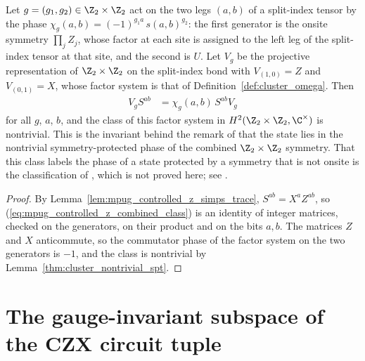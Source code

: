 \begin{lemma}
    \label{lem:mpug_controlled_z_combined_class}
    \leanok
    Let $g=(g_1,g_2)\in\Z_2\times\Z_2$ act on the two legs $(a,b)$ of a
    split-index tensor by the phase
    $\chi_g(a,b)=(-1)^{g_1a}\,s(a,b)^{g_2}$: the first generator is the onsite
    symmetry $\prod_jZ_j$, whose factor at each site is assigned to the left
    leg of the split-index tensor at that site, and the second is $U$. Let
    $V_g$ be the projective representation of $\Z_2\times\Z_2$ on the
    split-index bond with $V_{(1,0)}=Z$ and $V_{(0,1)}=X$, whose factor
    system is that of Definition~\ref{def:cluster_omega}. Then
    \begin{align}
        V_gS^{ab} & =\chi_g(a,b)\,S^{ab}V_g
        \label{eq:mpug_controlled_z_combined_class}
    \end{align}
    for all $g$, $a$, $b$, and the class of this factor system in
    $H^2(\Z_2\times\Z_2,\C^\times)$ is nontrivial. This is the invariant
    behind the remark of \cite[line~3970]{FrancoRubio2025MPUGauging} that the
    state lies in the nontrivial symmetry-protected phase of the combined
    $\Z_2\times\Z_2$ symmetry. That this class labels the phase of a state
    protected by a symmetry that is not onsite is the classification of
    \cite{Stephen2024SIMPS}, which is not proved here; see
    \cite{gap:fbc25_controlled_z_split_index_class_scope}.
\end{lemma}

\begin{proof}\leanok
    By Lemma~\ref{lem:mpug_controlled_z_simps_trace}, $S^{ab}=X^aZ^{ab}$, so
    (\ref{eq:mpug_controlled_z_combined_class}) is an identity of integer
    matrices, checked on the generators, on their product and on the bits
    $a,b$. The matrices $Z$ and $X$ anticommute, so the commutator phase of
    the factor system on the two generators is $-1$, and the class is
    nontrivial by Lemma~\ref{thm:cluster_nontrivial_spt}.
\end{proof}

\section{The gauge-invariant subspace of the CZX circuit tuple}
\label{sec:mpug_czx_gauge_invariant}

